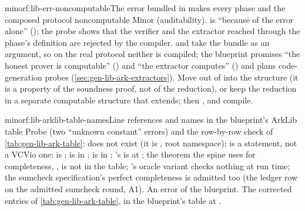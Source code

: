 \begin{finding}{minor}{f:lib-err-noncomputable}{The error bundled in \texorpdfstring{}{Component.Def} makes every phase and the composed protocol noncomputable}
\textsf{Minor (auditability).}
  is  \enquote{because of the error
alone} (); the probe  shows that the
verifier and the extractor reached through the phase's definition are rejected by the compiler.
\allowbreak{}\allowbreak{}\allowbreak{} and  take the bundle
 as an argument, so on the real protocol neither is compiled; the blueprint promises
\enquote{the honest prover is computable} () and \enquote{the
extractor computes} () and plans code-generation probes
(\cref{sec:gen-lib-ark-extractors}).
 Move  out of  into the 
structure (it is a property of the soundness proof, not of the reduction), or keep the reduction in
a separate computable structure that  extends; then ,
 and  compile.
\end{finding}

\begin{finding}{minor}{f:lib-arklib-table-names}{Line references and names in the blueprint's ArkLib table}
 Probe  (two \enquote{unknown constant} errors) and the
row-by-row check of \cref{tab:gen-lib-ark-table}: \allowbreak{}\allowbreak{}\allowbreak{}
does not exist (it is , root namespace);
 is a  statement, not a VCVio one;  is
;  is in ;  is in
\allowbreak{}; 's  is at ; the
theorem the spine uses for completeness,
\allowbreak{}\allowbreak{}\allowbreak{}\allowbreak{}, is not in the table;
's oracle variant checks nothing at run time; the sumcheck specification's
perfect completeness is admitted too (the ledger row on the admitted sumcheck round, A1).
 An error of the blueprint.
 The corrected entries of \cref{tab:gen-lib-ark-table}, in the blueprint's
table at .
\end{finding}

